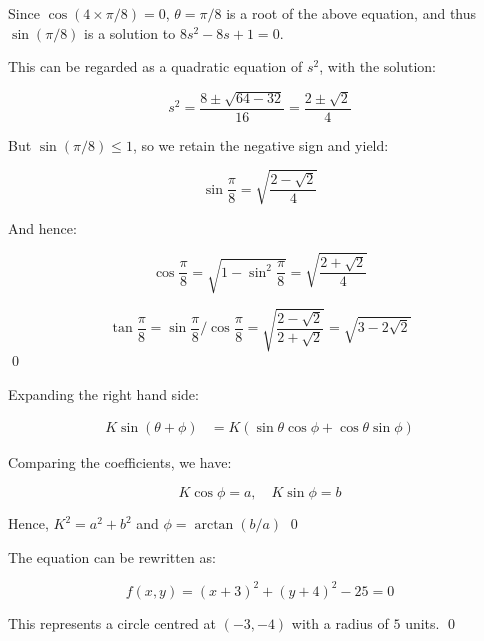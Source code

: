 \documentclass[12pt]{article}
\begin{document}
Since $\cos(4 \times \pi/8) = 0$, $\theta = \pi/8$ is a root of the above equation, and thus $\sin{(\pi/8)}$ is a solution to $8s^{2} - 8s + 1 = 0$.

This can be regarded as a quadratic equation of $s^{2}$, with the solution:

\begin{equation}
    s^{2} = \frac{8 \pm \sqrt{64 - 32}}{16} = \frac{2 \pm \sqrt{2}}{4}
\end{equation}

But $\sin{(\pi/8)} \le 1$, so we retain the negative sign and yield:

\begin{equation}
    \sin{\frac{\pi}{8}} = \sqrt{\frac{2 - \sqrt{2}}{4}}
\end{equation}

And hence:

\begin{equation}
    \cos{\frac{\pi}{8}} = \sqrt{1 - \sin^{2}{\frac{\pi}{8}}} = \boxed{\sqrt{\frac{2 + \sqrt{2}}{4}}}
\end{equation}

\begin{equation}
    \tan{\frac{\pi}{8}} = \sin{\frac{\pi}{8}}/\cos{\frac{\pi}{8}} = \sqrt{\frac{2 - \sqrt{2}}{2 + \sqrt{2}}} = \boxed{\sqrt{3 - 2\sqrt{2}}}
\end{equation}
\qed


Expanding the right hand side:

\begin{equation}
    \begin{split}
        K \sin{(\theta + \phi)} &= K (\sin{\theta}\cos{\phi} + \cos{\theta}\sin{\phi})
    \end{split}
\end{equation}

Comparing the coefficients, we have:

\begin{equation}
    K \cos{\phi} = a, \quad K \sin{\phi} = b
\end{equation}

Hence, $K^{2} = a^{2} + b^{2}$ and $\phi = \arctan{(b/a)}$
\qed


The equation can be rewritten as:

\begin{equation}
    f(x, y) = (x + 3)^{2} + (y + 4)^{2} - 25 = 0
\end{equation}

This represents a circle centred at $(-3, -4)$ with a radius of $5$ units.
\qed
\end{document}
